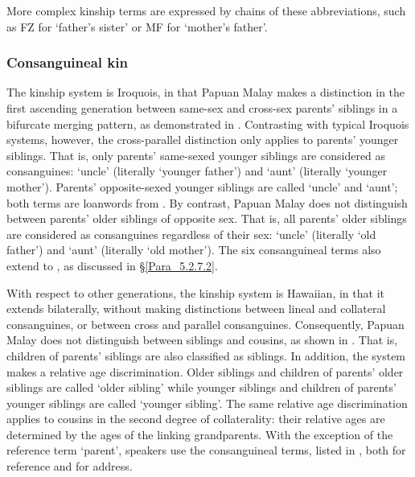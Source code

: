 More complex kinship terms are expressed by chains of these abbreviations, such as FZ for ‘father’s sister’ or MF for ‘mother’s father’.


\subsubsection[Consanguineal kin]{Consanguineal kin}
\label{Para_5.2.7.1}
The kinship system is Iroquois, in that Papuan Malay makes a distinction in the first ascending generation between same-sex and cross-sex parents’ siblings in a bifurcate merging pattern, as demonstrated in . Contrasting with typical Iroquois systems, however, the cross-parallel distinction only applies to parents’ younger siblings. That is, only parents’ same-sexed younger siblings are considered as consanguines:  ‘uncle’ (literally ‘younger father’) and  ‘aunt’ (literally ‘younger mother’). Parents’ opposite-sexed younger siblings are called  ‘uncle’ and  ‘aunt’; both terms are loanwords from . By contrast, Papuan Malay does not distinguish between parents’ older siblings of opposite sex. That is, all parents’ older siblings are considered as consanguines regardless of their sex:  ‘uncle’ (literally ‘old father’) and  ‘aunt’ (literally ‘old mother’). The six consanguineal terms also extend to , as discussed in §\ref{Para_5.2.7.2}.



With respect to other generations, the kinship system is Hawaiian, in that it extends bilaterally, without making distinctions between lineal and collateral consanguines, or between cross and parallel consanguines. Consequently, Papuan Malay does not distinguish between siblings and cousins, as shown in . That is, children of parents’ siblings are also classified as siblings. In addition, the system makes a relative age discrimination. Older siblings and children of parents’ older siblings are called  ‘older sibling’ while younger siblings and children of parents’ younger siblings are called  ‘younger sibling’. The same relative age discrimination applies to cousins in the second degree of collaterality: their relative ages are determined by the ages of the linking grandparents. With the exception of the reference term  ‘parent’, speakers use the consanguineal terms, listed in , both for reference and for address.



